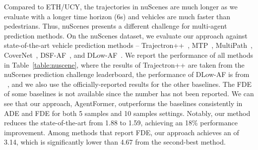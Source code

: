 \documentclass[10pt,twocolumn,letterpaper]{article}
\newcommand{\mname}{AgentFormer}
\begin{document}
Compared to ETH/UCY, the trajectories in nuScenes are much longer as we evaluate with a longer time horizon (6s) and vehicles are much faster than pedestrians. Thus, nuScenes presents a different challenge for multi-agent prediction methods. On the nuScenes dataset, we evaluate our approach against state-of-the-art vehicle prediction methods -- Trajectron++~\cite{salzmann2020trajectron++}, MTP~\cite{cui2019multimodal}, MultiPath~\cite{chai2020multipath}, CoverNet~\cite{phan2020covernet}, DSF-AF~\cite{ma2020diverse}, and DLow-AF~\cite{yuan2020dlow}. We report the performance of all methods in Table~\ref{table:nuscene}, where the results of Trajectron++ are taken from the nuScenes prediction challenge leaderboard, the performance of DLow-AF is from ~\cite{ma2020diverse}, and we also use the officially-reported results for the other baselines. The FDE of some baselines is not available since the number has not been reported. We can see that our approach, \mname, outperforms the baselines consistently in ADE and FDE for both 5 samples and 10 samples settings. Notably, our method reduces the state-of-the-art  from 1.88 to 1.59, achieving an 18\% performance improvement. Among methods that report FDE, our approach achieves an  of 3.14, which is significantly lower than 4.67 from the second-best method. 
\end{document}

